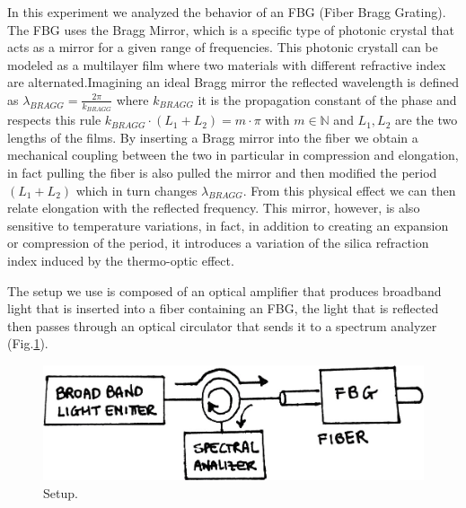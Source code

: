 
In this experiment we analyzed the behavior of an FBG (Fiber Bragg Grating). The FBG uses the Bragg Mirror, which is a specific type of photonic crystal that acts as a mirror for a given range of frequencies. This photonic crystall can be modeled as a multilayer film where two materials with different refractive index are alternated.Imagining an ideal Bragg mirror the reflected wavelength is defined as $\lambda_{BRAGG} = \frac{2\pi}{k_{BRAGG}}$ where $k_{BRAGG}$ it is the propagation constant of the phase and respects this rule $k_{BRAGG} \cdot (L_1 + L_2) = m \cdot \pi$ with $m \in \mathbb{N}$ and $L_1, L_2$ are the two lengths of the films. By inserting a Bragg mirror into the fiber we obtain a mechanical coupling between the two in particular in compression and elongation, in fact pulling the fiber is also pulled the mirror and then modified the period $(L_1 + L_2)$ which in turn changes $\lambda_{BRAGG}$. From this physical effect we can then relate elongation with the reflected frequency. This mirror, however, is also sensitive to temperature variations, in fact, in addition to creating an expansion or compression of the period, it introduces a variation of the silica refraction index induced by the thermo-optic effect.

The setup we use is composed of an optical amplifier that produces broadband light that is inserted into a fiber containing an FBG, the light that is reflected then passes through an optical circulator that sends it to a spectrum analyzer (Fig.\ref{fig:setup}).
\begin{figure}[h]
    \centering
    \includegraphics[scale=0.3]{img/setup.jpg}
    \caption{Setup.}
    \label{fig:setup}
\end{figure}

